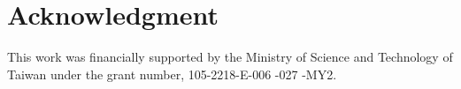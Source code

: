 \documentclass[conference]{IEEEtran}
\begin{document}



\section*{Acknowledgment}
\label{sec:Acknowledgment}
This work was financially supported by the Ministry of Science and Technology of Taiwan under the grant number, 105-2218-E-006 -027 -MY2.

\tiny
\balance



\end{document}
